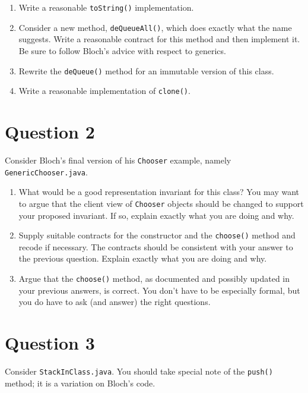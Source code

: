 \documentclass[10pt]{article}
\begin{document}
\begin{enumerate}
\item
Write a reasonable \texttt{toString()} implementation.

\item
Consider a new method, \texttt{deQueueAll()}, which does exactly  what the name suggests. Write a reasonable contract for this method and then implement it.  Be sure to follow Bloch's advice with respect to generics.

\item
Rewrite the \texttt{deQueue()} method for an immutable version of this class.

\item
Write a reasonable implementation of \texttt{clone()}. 


\end{enumerate}
\newpage
\section{Question 2}

Consider Bloch's final version of his {\tt Chooser} example, namely {\tt GenericChooser.java}.


\begin{enumerate}
\item
What would be a good representation invariant for this class?
You may want to argue that the client
view of {\tt Chooser} objects  should be changed to support 
your proposed invariant.
If so, explain exactly what you are doing and why.
\item
Supply suitable contracts for the constructor and the {\tt choose()} method
and recode if necessary.
The contracts should be consistent with your answer to the previous question.
Explain exactly what you are doing and why.
\item
Argue that the {\tt choose()} method, as documented and possibly updated
in your previous answers, is correct.  
You don't have to be especially formal, but you do have
to ask (and answer) the right questions.  
\end{enumerate}

\newpage
\section{Question 3}

Consider {\tt StackInClass.java}.
You should take special note of the {\tt push()} method;
it is a variation on Bloch's code.
\end{document}
